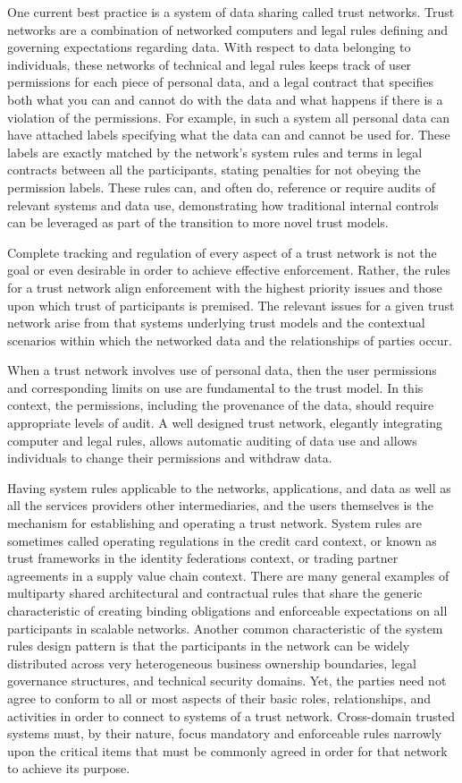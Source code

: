 One current best practice is a system of data sharing called trust networks.
Trust networks are a combination of networked computers and legal rules defining and governing expectations regarding data.
With respect to data belonging to individuals, these networks of technical and legal rules keeps track of user permissions for each piece of personal data, and a legal contract that specifies both what you can and cannot do with the data and what happens if there is a violation of the permissions.
For example, in such a system all personal data can have attached labels specifying what the data can and cannot be used for.
These labels are exactly matched by the network's system rules and terms in legal contracts between all the participants, stating penalties for not obeying the permission labels.
These rules can, and often do, reference or require audits of relevant systems and data use, demonstrating how traditional internal controls can be leveraged as part of the transition to more novel trust models.

Complete tracking and regulation of every aspect of a trust network is not the goal or even desirable in order to achieve effective enforcement.
Rather, the rules for a trust network align enforcement with the highest priority issues and those upon which trust of participants is premised.
The relevant issues for a given trust network arise from that systems  underlying trust models and the contextual scenarios within which the networked data and the relationships of parties occur.

When a trust network involves use of personal data, then the user permissions and corresponding limits on use are fundamental to the trust model.
In this context, the permissions, including the provenance of the data, should require appropriate levels of audit.
A well designed trust network, elegantly integrating computer and legal rules, allows automatic auditing of data use and allows individuals to change their permissions and withdraw data.

Having system rules applicable to the networks, applications, and data as well as all the services providers other intermediaries, and the users themselves is the mechanism for establishing and operating a trust network.
System rules are sometimes called operating regulations in the credit card context, or known as trust frameworks in the identity federations context, or trading partner agreements in a supply value chain context.
There are many general examples of multiparty shared architectural and contractual rules that share the generic characteristic of creating binding obligations and enforceable expectations on all participants in scalable networks.
Another common characteristic of the system rules design pattern is that the participants in the network can be widely distributed across very heterogeneous business ownership boundaries, legal governance structures, and technical security domains.
Yet, the parties need not agree to conform to all or most aspects of their basic roles, relationships, and activities in order to connect to systems of a trust network.
Cross-domain trusted systems must, by their nature, focus mandatory and enforceable rules narrowly upon the critical items that must be commonly agreed in order for that network to achieve its purpose.

